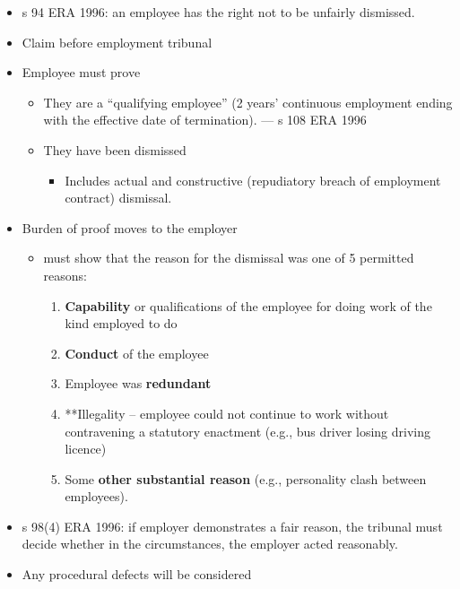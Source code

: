 \documentclass[
]{article}
\providecommand{\tightlist}{%
  \setlength{\itemsep}{0pt}\setlength{\parskip}{0pt}}
\begin{document}
\begin{itemize}
\tightlist
\item
  s 94 ERA 1996: an employee has the right not to be unfairly dismissed.
\item
  Claim before employment tribunal
\item
  Employee must prove

  \begin{itemize}
  \tightlist
  \item
    They are a ``qualifying employee'' (2 years' continuous employment
    ending with the effective date of termination). --- s 108 ERA 1996
  \item
    They have been dismissed

    \begin{itemize}
    \tightlist
    \item
      Includes actual and constructive (repudiatory breach of employment
      contract) dismissal.
    \end{itemize}
  \end{itemize}
\item
  Burden of proof moves to the employer

  \begin{itemize}
  \tightlist
  \item
    must show that the reason for the dismissal was one of 5 permitted
    reasons:

    \begin{enumerate}
    \tightlist
    \item
      \textbf{Capability} or qualifications of the employee for doing
      work of the kind employed to do
    \item
      \textbf{Conduct} of the employee
    \item
      Employee was \textbf{redundant}
    \item
      **Illegality -- employee could not continue to work without
      contravening a statutory enactment (e.g., bus driver losing
      driving licence)
    \item
      Some \textbf{other substantial reason} (e.g., personality clash
      between employees).
    \end{enumerate}
  \end{itemize}
\item
  s 98(4) ERA 1996: if employer demonstrates a fair reason, the tribunal
  must decide whether in the circumstances, the employer acted
  reasonably.
\item
  Any procedural defects will be considered


\end{itemize}
\end{document}
